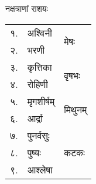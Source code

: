 नक्षत्राणां राशयः


{\small\renewcommand{\arraystretch}{0.333}
\begin{tabular}{|l|l|l|}
\cline{3-3} \cline{1-2}\multirow{4}{*}{ १.} & \multirow{4}{*}{अश्विनी}                  & \multirow{9}{*}{मेषः} \\ 
\\
\\
\\
\cline{1-2}\multirow{4}{*}{ २.} & \multirow{4}{*}{भरणी}                     & \\
\\
\\
\\
\cline{1-2}\multirow{4}{*}{ ३.} & \multirow{4}{*}{कृत्तिका}                 & \\
\cline{3-3} & & \multirow{9}{*}{वृषभः} \\ 
\\
\\
\cline{1-2}\multirow{4}{*}{ ४.} & \multirow{4}{*}{रोहिणी}                   & \\
\\
\\
\\
\cline{1-2}\multirow{4}{*}{ ५.} & \multirow{4}{*}{मृगशीर्षम्}               & \\
\\
\cline{3-3} & & \multirow{9}{*}{मिथुनम्} \\ 
\\
\cline{1-2}\multirow{4}{*}{ ६.} & \multirow{4}{*}{आर्द्रा}                  & \\
\\
\\
\\
\cline{1-2}\multirow{4}{*}{ ७.} & \multirow{4}{*}{पुनर्वसुः}                & \\
\\
\\
\cline{3-3} & & \multirow{9}{*}{कटकः} \\
\cline{1-2}\multirow{4}{*}{ ८.} & \multirow{4}{*}{पुष्यः}                   & \\
\\
\\
\\
\cline{1-2}\multirow{4}{*}{ ९.} & \multirow{4}{*}{आश्लेषा}                  & \\
\\
\\
\\\hline
\end{tabular}

}
